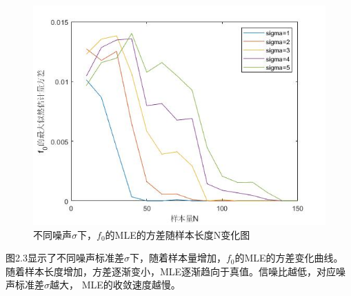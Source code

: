 \documentclass[fontset=windows]{article}
\numberwithin{figure}{section}
\begin{document}
\begin{figure}[H]
	\centering
	\includegraphics[scale=0.7]{untitled2-3.jpg}
	\caption{不同噪声\(\sigma\)下，\(f_0\)的MLE的方差随样本长度N变化图}
	\label{2.3}
\end{figure}

图2.3显示了不同噪声标准差\(\sigma\)下，随着样本量增加，\(f_0\)的MLE的方差变化曲线。
随着样本长度增加，方差逐渐变小，MLE逐渐趋向于真值。信噪比越低，对应噪声标准差\(\sigma\)越大，
MLE的收敛速度越慢。


\end{document}

